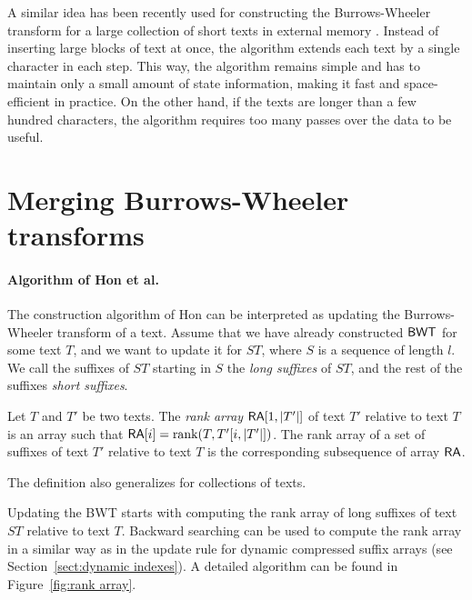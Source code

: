 A similar idea has been recently used for constructing the Burrows-Wheeler transform for a large collection of short texts in external memory \cite{Bauer2011}. Instead of inserting large blocks of text at once, the algorithm extends each text by a single character in each step. This way, the algorithm remains simple and has to maintain only a small amount of state information, making it fast and space-efficient in practice. On the other hand, if the texts are longer than a few hundred characters, the algorithm requires too many passes over the data to be useful.


\section{Merging Burrows-Wheeler transforms}\label{sect:merging}

\paragraph{Algorithm of Hon et al.}

The construction algorithm of Hon  can be interpreted as updating the Burrows-Wheeler transform of a text. Assume that we have already constructed $\mathsf{BWT}$ for some text $T$, and we want to update it for $ST$, where $S$ is a sequence of length $l$. We call the suffixes of $ST$ starting in $S$ the \emph{long suffixes} of $ST$, and the rest of the suffixes \emph{short suffixes}.

\begin{definition}
Let $T$ and $T'$ be two texts. The \emph{rank array} $\mathsf{RA}[1,\lvert T' \rvert]$ of text $T'$ relative to text $T$ is an array such that $\mathsf{RA}[i] = \operatorname{rank}(T, T'[i,\lvert T' \rvert])$. The rank array of a set of suffixes of text $T'$ relative to text $T$ is the corresponding subsequence of array $\mathsf{RA}$.
\end{definition}

The definition also generalizes for collections of texts.

Updating the BWT starts with computing the rank array of long suffixes of text $ST$ relative to text $T$. Backward searching can be used to compute the rank array in a similar way as in the update rule for dynamic compressed suffix arrays (see Section~\ref{sect:dynamic indexes}). A detailed algorithm can be found in Figure~\ref{fig:rank array}.

